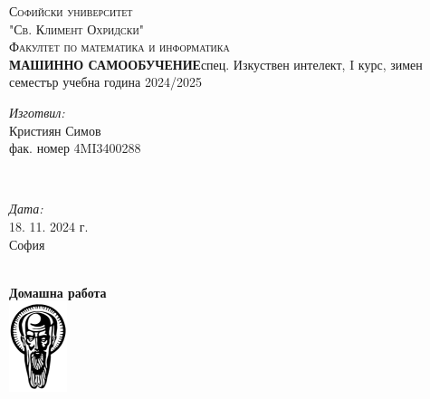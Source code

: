 \documentclass[12pt]{article}
\begin{document}
	\begin{titlepage}	
		\newcommand{\HRule}{\rule{\linewidth}{0.5mm}} %
		\begin{center}
		\textsc{\LARGE Софийски университет }\\[0.3cm]
		\textsc{\LARGE "Св. Климент Охридски" }\\[0.3cm]
		\textsc{\Large Факултет по математика и информатика }\\[0.2cm]
		
		{\fontsize{12}{18}\selectfont \bf МАШИННО САМООБУЧЕНИЕ}\vspace{15pt}\newline спец. Изкуствен интелект, I курс, зимен семестър \newline учебна година 2024/2025
		\vspace{30pt}
		
		
		
		
		
		\begin{minipage}{0.4\textwidth}
			\begin{flushleft}\large
				\emph{Изготвил:} \\
				Кристиян Симов \\ 
				фак. номер 4MI3400288
			\end{flushleft}
		\end{minipage}
		~
		\begin{minipage}{0.4\textwidth}
			\begin{flushright}
				\large
				\emph{Дата:}\\
				18. 11. 2024 г. %
				\\София 
			\end{flushright}
		\end{minipage}\\[1cm]
		\bigskip
		{\large \textbf{Домашна работа }}\\[1cm] %
		\includegraphics{logo_su_no_text.png}\\[1cm]
		\vfill %
		\end{center}
	\end{titlepage}
	
\end{document}
